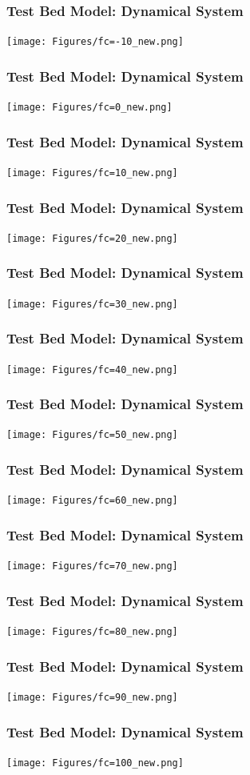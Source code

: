 \documentclass{beamer}
\begin{document}
\begin{frame}
\frametitle{Test Bed Model: Dynamical System}
\centering
\texttt{[image: Figures/fc=-10\_new.png]}
\end{frame}
\begin{frame}
\frametitle{Test Bed Model: Dynamical System}
\centering
\texttt{[image: Figures/fc=0\_new.png]}
\end{frame}
\begin{frame}
\frametitle{Test Bed Model: Dynamical System}
\centering
\texttt{[image: Figures/fc=10\_new.png]}
\end{frame}
\begin{frame}
\frametitle{Test Bed Model: Dynamical System}
\centering
\texttt{[image: Figures/fc=20\_new.png]}
\end{frame}
\begin{frame}
\frametitle{Test Bed Model: Dynamical System}
\centering
\texttt{[image: Figures/fc=30\_new.png]}
\end{frame}
\begin{frame}
\frametitle{Test Bed Model: Dynamical System}
\centering
\texttt{[image: Figures/fc=40\_new.png]}
\end{frame}
\begin{frame}
\frametitle{Test Bed Model: Dynamical System}
\centering
\texttt{[image: Figures/fc=50\_new.png]}
\end{frame}
\begin{frame}
\frametitle{Test Bed Model: Dynamical System}
\centering
\texttt{[image: Figures/fc=60\_new.png]}
\end{frame}
\begin{frame}
\frametitle{Test Bed Model: Dynamical System}
\centering
\texttt{[image: Figures/fc=70\_new.png]}
\end{frame}
\begin{frame}
\frametitle{Test Bed Model: Dynamical System}
\centering
\texttt{[image: Figures/fc=80\_new.png]}
\end{frame}
\begin{frame}
\frametitle{Test Bed Model: Dynamical System}
\centering
\texttt{[image: Figures/fc=90\_new.png]}
\end{frame}
\begin{frame}
\frametitle{Test Bed Model: Dynamical System}
\centering
\texttt{[image: Figures/fc=100\_new.png]}
\end{frame}
\end{document}
